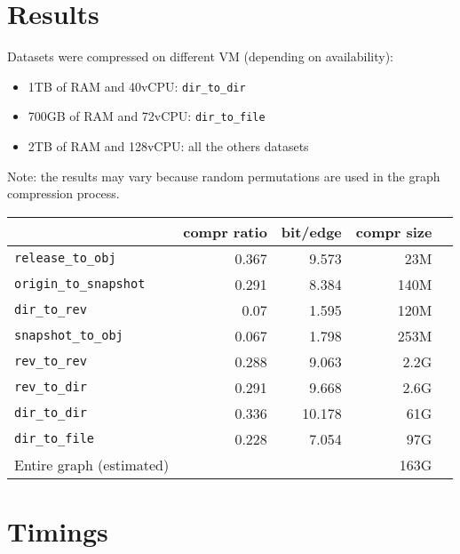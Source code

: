 \documentclass[11pt,a4paper]{article}
\begin{document}
\section{Results}

Datasets were compressed on different VM (depending on availability):

\begin{itemize}
    \item 1TB of RAM and 40vCPU: \texttt{dir_to_dir}
    \item 700GB of RAM and 72vCPU: \texttt{dir_to_file}
    \item 2TB of RAM and 128vCPU: all the others datasets
\end{itemize}

Note: the results may vary because random permutations are used in the graph
compression process.

\begin{center}
    \begin{tabular}{@{} l *4r @{}}
        \toprule
        \multicolumn{1}{c}{} &
            \textbf{compr ratio} & \textbf{bit/edge} & \textbf{compr
            size\footnotemark} \\
        \midrule
        \texttt{release\_to\_obj} & 0.367 & 9.573 & 23M \\
        \texttt{origin\_to\_snapshot} & 0.291 & 8.384 & 140M \\
        \texttt{dir\_to\_rev} & 0.07 & 1.595 & 120M & \\
        \texttt{snapshot\_to\_obj} & 0.067 & 1.798 & 253M \\
        \texttt{rev\_to\_rev} & 0.288 & 9.063 & 2.2G \\
        \texttt{rev\_to\_dir} & 0.291 & 9.668 & 2.6G \\
        \texttt{dir\_to\_dir} & 0.336 & 10.178 & 61G \\
        \texttt{dir\_to\_file} & 0.228 & 7.054 & 97G \\
        \midrule
        Entire graph (estimated) & & & 163G \\
        \bottomrule
    \end{tabular}
\end{center}


\section{Timings}
\end{document}
